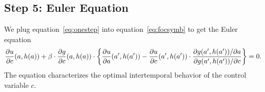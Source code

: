 \documentclass[letterpaper,12pt,leqno]{article}
\begin{document}
\subsection{Step 5: Euler Equation}

We plug equation~\eqref{eq:onestep} into equation~\eqref{eq:focsymb} to get the Euler equation
\begin{equation*}
\frac{\partial u}{\partial c}(a,h(a))+\beta \cdot \frac{\partial g}{\partial c}(a,h(a)) \cdot \left\lbrace \frac{\partial  u}{\partial a}(a',h(a'))-\frac{\partial u}{\partial c}(a',h(a')) \cdot \frac{\partial g(a',h(a'))/\partial a}{\partial g(a',h(a'))/\partial c} \right\rbrace=0.
\end{equation*}
The equation characterizes the optimal intertemporal behavior of the control variable $c$.
\end{document}
